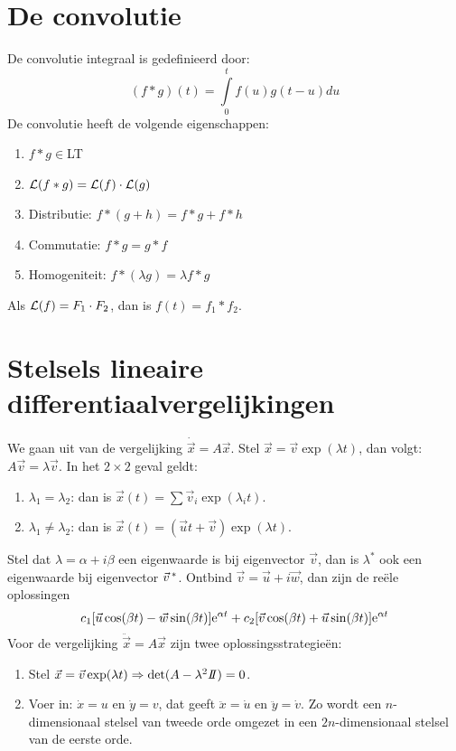 \section{De convolutie}
De convolutie integraal is gedefinieerd door:
\[
(f*g)(t)=\int\limits_0^tf(u)g(t-u)du
\]
De convolutie heeft de volgende eigenschappen:
\begin{enumerate}
\item $f*g\in$LT
\item ${\cal L}(f*g)={\cal L}(f)\cdot{\cal L}(g)$
\item Distributie: $f*(g+h)=f*g+f*h$
\item Commutatie: $f*g=g*f$
\item Homogeniteit: $f*(\lambda g)=\lambda f*g$
\end{enumerate}
Als ${\cal L}(f)=F_1\cdot F_2$, dan is $f(t)=f_1*f_2$.

\section{Stelsels lineaire differentiaalvergelijkingen}
We gaan uit van de vergelijking $\dot{\vec{x}}=A\vec{x}$. Stel $\vec{x}=\vec{v}\exp(\lambda t)$,
dan volgt: $A\vec{v}=\lambda\vec{v}$. In het $2\times2$ geval geldt:
\begin{enumerate}
\item $\lambda_1=\lambda_2$: dan is $\vec{x}(t)=\sum\vec{v}_i\exp(\lambda_it)$.
\item $\lambda_1\neq\lambda_2$: dan is $\vec{x}(t)=(\vec{u}t+\vec{v})\exp(\lambda t)$.
\end{enumerate}
Stel dat $\lambda=\alpha+i\beta$ een eigenwaarde is bij eigenvector $\vec{v}$,
dan is $\lambda^*$ ook een eigenwaarde bij eigenvector $\vec{v}\,^*$. Ontbind
$\vec{v}=\vec{u}+i\vec{w}$, dan zijn de re\"ele oplossingen
\[
c_1[\vec{u}\cos(\beta t)-\vec{w}\sin(\beta t)]{\rm e}^{\alpha t}+c_2[\vec{v}\cos(\beta t)+\vec{u}\sin(\beta t)]{\rm e}^{\alpha t}
\]
\npar
Voor de vergelijking $\ddot{\vec{x}}=A\vec{x}$ zijn twee oplossingsstrategie\"en:
\begin{enumerate}
\item Stel $\vec{x}=\vec{v}\exp(\lambda t)\Rightarrow\det(A-\lambda^2I\hspace{-1mm}I)=0$.
\item Voer in: $\dot{x}=u$ en $\dot{y}=v$, dat geeft $\ddot{x}=\dot{u}$ en
      $\ddot{y}=\dot{v}$. Zo wordt een $n$-dimensionaal stelsel van tweede orde
      omgezet in een $2n$-dimensionaal stelsel van de eerste orde.
\end{enumerate}

